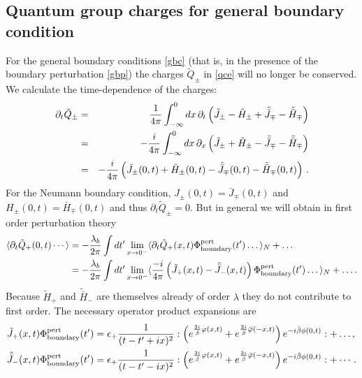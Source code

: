 \documentclass[a4paper,12pt]{article}
\newcommand{\hb}{\hat{\beta}}
\numberwithin{equation}{section}
\begin{document}
\subsection{Quantum group charges for general boundary condition\label{sectqgcgbc}}

For the general boundary conditions \eqref{gbc} (that is, in the
presence of the boundary perturbation \eqref{gbp}) the charges
$\tilde{Q}_\pm$ in \eqref{qce} will no longer be conserved. We
calculate the time-dependence of the charges:
\begin{eqnarray*}
\partial_t \tilde{Q}_\pm & = & {1\over 4\pi} \int_{-\infty}^0
dx\,\partial_t\left( \tilde{J}_\pm - \tilde{H}_\pm
+\tilde{\bar{J}}_\mp - \tilde{\bar{H}}_\mp\right) \\ & = &
-{i\over 4\pi} \int_{-\infty}^0 dx\,\partial_x\left( \tilde{J}_\pm
+ \tilde{H}_\pm -\tilde{\bar{J}}_\mp - \tilde{\bar{H}}_\mp\right)
\\
& = &-{i\over 4\pi}\left( \tilde{J}_\pm(0,t) + \tilde{H}_\pm(0,t)
-\tilde{\bar{J}}_\mp(0,t) - \tilde{\bar{H}}_\mp(0,t)\right)\,.
\end{eqnarray*}
For the Neumann boundary condition, $J_\pm(0,t) =
\bar{J}_\mp(0,t)$ and $H_\pm(0,t) = \bar{H}_\mp(0,t)$ and thus
$\partial_t\tilde{Q}_\pm=0$. But in general we will obtain in
first order perturbation theory
\begin{align}
  \langle \partial_t \tilde{Q}_+(0,t)\cdots\rangle
  &=-\frac{\lambda_b}{2\pi}\int dt'\lim_{x\rightarrow 0^-}
  \langle\partial_t\tilde{Q}_+(x,t)\Phi^{\rm pert}_{\rm boundary}(t')
  \dots\rangle_N+\dots\\
  &=-\frac{\lambda_b}{2\pi}\int dt'\lim_{x\rightarrow 0^-}
  \langle\frac{-i}{4\pi}
  \left(\tilde{J}_+(x,t)-\tilde{\bar{J}}_-(x,t)\right)
  \Phi^{\rm pert}_{\rm boundary}(t')
  \dots\rangle_N+\dots.
\end{align}
Because $\tilde{H}_+$ and $\tilde{\bar{H}}_-$ are themselves
already of order $\lambda$ they do not contribute to first order.
The necessary operator product expansions are
\begin{align*}
  \tilde{J}_+(x,t)\Phi^{\rm pert}_{\rm boundary}(t')&=
  \epsilon_+\frac{1}{(t-t'+ix)^2}
  :\left(e^{\frac{2i}{\hb}\varphi(x,t)}
  +e^{\frac{2i}{\hb}\bar{\varphi}(-x,t)}
  \right)e^{-i\hb\phi(0,t)}:
  +\dots,\\
  \tilde{\bar{J}}_-(x,t)\Phi^{\rm pert}_{\rm boundary}(t')&=
  \epsilon_+\frac{1}{(t-t'-ix)^2}
  :\left(e^{\frac{2i}{\hb}\varphi(x,t)}
  +e^{\frac{2i}{\hb}\bar{\varphi}(-x,t)}
  \right)e^{-i\hb\phi(0,t)}:
  +\cdots.\\
\end{align*}
\end{document}
